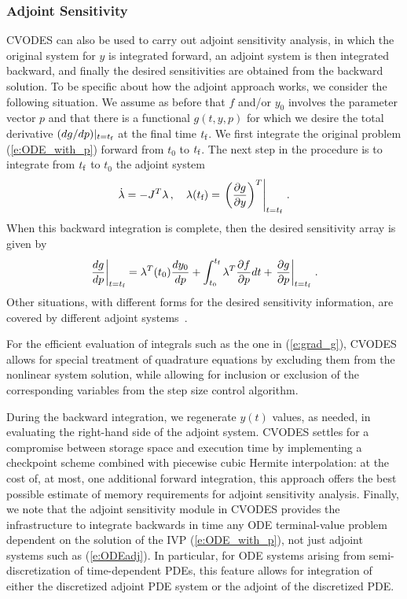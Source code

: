 \subsubsection{Adjoint Sensitivity}
CVODES can also be used to carry out adjoint sensitivity analysis,
in which the original system for $y$ is integrated forward,
an adjoint system is then integrated backward, and finally the desired
sensitivities are obtained from the backward solution.
To be specific about how the adjoint approach works, we consider
the following situation. We assume as before that $f$ and/or $y_0$
involves the parameter vector $p$ and that there is a
functional $g(t,y,p)$ for which we desire the
total derivative $(dg/dp)|_{t=t_{\mbox{\tiny f}}}$
at the final time $t_{\mbox{\scriptsize f}}$.
We first integrate the original problem (\ref{e:ODE_with_p}) forward
from $t_0$ to $t_{\mbox{\scriptsize f}}$. The next step in the procedure is to integrate
from $t_{\mbox{\scriptsize f}}$ to $t_0$ the adjoint system
\begin{equation}\label{e:ODEadj}
  \dot{\lambda} = -J^T \lambda \, , \quad
  \lambda(t_{\mbox{\scriptsize f}}) = \left. \left( \frac{\partial g}{\partial y}
    \right)^T \right| _{t=t_{\mbox{\tiny f}}} \, .
\end{equation}
When this backward integration is complete, then the desired
sensitivity array is given by
\begin{equation}\label{e:grad_g}
  \left. \frac{dg}{dp}\right|_{t=t_{\mbox{\tiny f}}} =
  \lambda^T(t_0) \frac{dy_0}{dp}
  + \int_{t_0}^{t_{\mbox{\tiny f}}} \lambda^T \frac{\partial f}{\partial p} dt +
  \left. \frac{\partial g}{\partial p} \right|_{t=t_{\mbox{\tiny f}}} \, .
\end{equation}
Other situations, with different forms for the desired sensitivity
information, are covered by different adjoint systems~\cite{CLPS:03}.

For the efficient evaluation of integrals such as the one in (\ref{e:grad_g}),
CVODES allows for special treatment of quadrature equations by excluding them
from the nonlinear system solution, while allowing for inclusion or exclusion
of the corresponding variables from the step size control algorithm.

During the backward integration, we regenerate $y(t)$ values, as needed,
in evaluating the right-hand side of the adjoint system.
%
CVODES settles for a compromise between storage space and execution time
by implementing a checkpoint scheme combined with piecewise cubic Hermite
interpolation: at the cost of, at most, one additional forward integration,
this approach offers the best possible estimate of memory requirements for
adjoint sensitivity analysis.
%
Finally, we note that the adjoint sensitivity module in CVODES provides
the infrastructure to integrate backwards in time any ODE terminal-value
problem dependent on the solution of the IVP (\ref{e:ODE_with_p}),
not just adjoint systems such as (\ref{e:ODEadj}). In particular,
for ODE systems arising from semi-discretization of time-dependent PDEs,
this feature allows for integration of either the discretized adjoint
PDE system or the adjoint of the discretized PDE.

